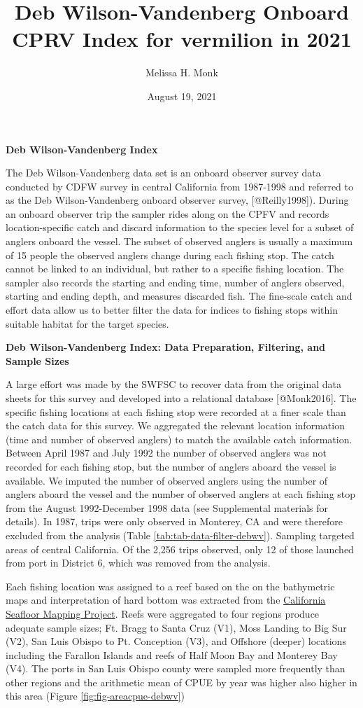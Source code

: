 \documentclass[
]{article}
\title{Deb Wilson-Vandenberg Onboard CPRV Index for vermilion in 2021}
\author{Melissa H. Monk}
\date{August 19, 2021}
\begin{document}
\maketitle

{
\setcounter{tocdepth}{2}
\tableofcontents
}
\textbf{Deb Wilson-Vandenberg Index}

The Deb Wilson-Vandenberg data set is an onboard observer survey data conducted
by CDFW survey in central California from 1987-1998 and referred to as the Deb
Wilson-Vandenberg onboard observer survey, {[}@Reilly1998{]}). During an onboard
observer trip the sampler rides along on the CPFV and records location-specific
catch and discard information to the species level for a subset of anglers
onboard the vessel. The subset of observed anglers is usually a maximum of 15
people the observed anglers change during each fishing stop. The catch cannot be
linked to an individual, but rather to a specific fishing location. The sampler
also records the starting and ending time, number of anglers observed, starting
and ending depth, and measures discarded fish. The fine-scale catch and effort
data allow us to better filter the data for indices
to fishing stops within suitable habitat for the target species.

\textbf{Deb Wilson-Vandenberg Index: Data Preparation, Filtering, and Sample Sizes}

A large effort was made by the SWFSC to recover data from the original data
sheets for this survey and developed into a relational database {[}@Monk2016{]}.
The specific fishing locations at each fishing stop were recorded at a finer
scale than the catch data for this survey. We aggregated the relevant location
information (time and number of observed anglers) to match the available catch
information. Between April 1987 and July 1992 the number of observed anglers
was not recorded for each fishing stop, but the number of anglers aboard the
vessel is available. We imputed the number of observed anglers using the number
of anglers aboard the vessel and the number of observed anglers at each fishing
stop from the August 1992-December 1998 data (see Supplemental materials for
details). In 1987, trips were only observed in Monterey, CA and were therefore
excluded from the analysis (Table \ref{tab:tab-data-filter-debwv}). Sampling
targeted areas of central California. Of the 2,256 trips observed, only 12 of
those launched from port in District 6, which was removed from the analysis.

Each fishing location was assigned to a reef based on the on the bathymetric maps
and interpretation of hard bottom was extracted from
the \href{http://seafloor.otterlabs.org/index.html}{California Seafloor Mapping Project}.
Reefs were aggregated to four regions produce adequate sample sizes;
Ft. Bragg to Santa Cruz (V1), Moss Landing to Big Sur (V2), San Luis Obispo to
Pt. Conception (V3), and Offshore (deeper) locations including the Farallon
Islands and reefs of Half Moon Bay and Monterey Bay (V4). The ports in San
Luis Obispo county were sampled more frequently than other regions and the arithmetic
mean of CPUE by year was higher also higher in this area (Figure \ref{fig:fig-areacpue-debwv})
\end{document}

